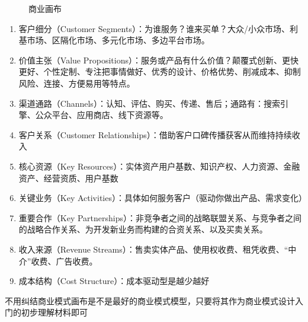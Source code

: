 \documentclass[letterpaper,11pt,english]{sphinxmanual}
\begin{document}
\begin{figure}[H]
\centering
\capstart

\noindent{}
\caption{商业画布}\label{\detokenize{chapter_idea/business:id30}}\end{figure}
\begin{enumerate}
%
\item {} 
客户细分（Customer
Segments）：为谁服务？谁来买单？大众/小众市场、利基市场、区隔化市场、多元化市场、多边平台市场。

\item {} 
价值主张（Value
Propositions）：服务或产品有什么价值？颠覆式创新、更快更好、个性定制、专注把事情做好、优秀的设计、价格优势、削减成本、抑制风险、连接、方便易用等特点。

\item {} 
渠道通路（Channels）：认知、评估、购买、传递、售后；通路有：搜索引擎、公众平台、应用商店、线下资源等。

\item {} 
客户关系（Customer
Relationships）：借助客户口碑传播获客从而维持持续收入

\item {} 
核心资源（Key
Resources）：实体资产用户基数、知识产权、人力资源、金融资产、经营资质、用户基数

\item {} 
关键业务（Key
Activities）：具体如何服务客户（驱动你做出产品、需求变化）

\item {} 
重要合作（Key
Partnerships）：非竞争者之间的战略联盟关系、与竞争者之间的战略合作关系、为开发新业务而构建的合资关系、以及买卖关系。

\item {} 
收入来源（Revenue
Streams）：售卖实体产品、使用权收费、租凭收费、“中介”收费、广告收费。

\item {} 
成本结构（Cost Structure）：成本驱动型是越少越好

\end{enumerate}

不用纠结商业模式画布是不是最好的商业模式模型，只要将其作为商业模式设计入门的初步理解材料即可
%
\begin{footnote}[342]\sphinxAtStartFootnote
{}
%
\end{footnote}
\end{document}
